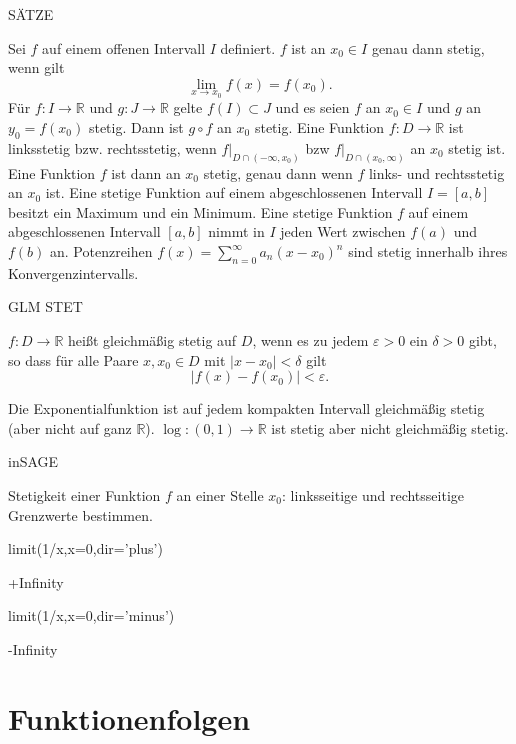 \documentclass[fontsize=12pt,paper=a4,twoside,bibtotoc,idxtotoc,
liststotoc,pagesize,BCOR1.2cm,DIV15,chapterprefix,pagesize=pdftex]{scrbook}
\theoremstyle{plain}
\theoremstyle{definition}
\theoremstyle{remark}
\begin{document}
SÄTZE


 Sei $f$ auf einem offenen Intervall $I$ definiert. $f$ ist an
$x_0 \in I$ genau dann stetig, wenn gilt
\[ \lim_{x \rightarrow x_0} f(x) = f(x_0). \]
 Für $f:I \rightarrow \mathbb{R}$ und $g:J \rightarrow
\mathbb{R}$ gelte $f(I) \subset J$ und es seien $f$ an $x_0 \in I$ und
$g$ an $y_0=f(x_0)$ stetig. Dann ist $g \circ f$ an $x_0$ stetig.
 Eine Funktion $f: D \rightarrow \mathbb{R}$ ist {\color{red}
linksstetig} bzw. {\color{red} rechtsstetig}, wenn $f|_{D\cap (-\infty,x_0)}$
bzw  $f|_{D\cap (x_0,\infty)}$ an $x_0$ stetig ist. Eine Funktion $f$
ist dann an $x_0$ stetig, genau dann wenn $f$ links- und rechtsstetig
an $x_0$ ist.
 Eine stetige Funktion auf einem abgeschlossenen Intervall $I=[a,b]$
besitzt ein Maximum und ein Minimum.
 Eine stetige Funktion $f$ auf einem abgeschlossenen  Intervall
$[a,b]$ nimmt in $I$ jeden Wert zwischen $f(a)$ und $f(b)$ an.
 Potenzreihen $f(x)=\sum_{n=0}^\infty a_n (x-x_0)^n$ sind stetig
innerhalb ihres Konvergenzintervalls.


GLM STET

$f: D \rightarrow \mathbb{R}$ heißt {\color{red} gleichmäßig stetig auf $D$},
wenn es zu jedem $\varepsilon >0$ ein $\delta>0$ gibt, so dass für alle
Paare $x,x_0 \in D$ mit $|x - x_0|< \delta$ gilt
\[ | f(x)-f(x_0)| < \varepsilon. \]

 Die Exponentialfunktion ist auf jedem kompakten Intervall
gleichmäßig stetig (aber nicht auf ganz $\mathbb{R}$). 
 $\log:(0,1) \rightarrow \mathbb{R}$ ist stetig aber nicht
gleichmäßig stetig.


inSAGE

Stetigkeit einer Funktion $f$ an einer Stelle $x_0$: linksseitige und rechtsseitige Grenzwerte bestimmen.
\begin{sagein}
limit(1/x,x=0,dir='plus') 
\end{sagein}
\begin{sage}
 +Infinity
\end{sage}
\begin{sagein}
 limit(1/x,x=0,dir='minus')
\end{sagein}
\begin{sage}
 -Infinity
\end{sage}

\section{Funktionenfolgen}
\end{document}
